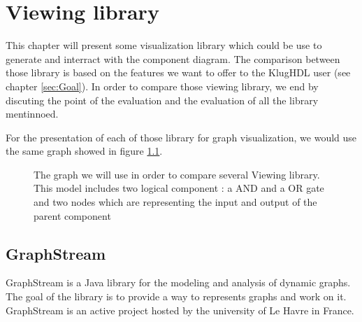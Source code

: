 \chapter{Viewing library} %
\label{cha:Viewing library}

This chapter will present some visualization library which could be use to generate and interract with the component diagram. The comparison between those library is based on the features we want to offer to the KlugHDL user (see chapter \ref{sec:Goal}). In order to compare those viewing library, we end by discuting the point of the evaluation and the evaluation of all the library mentinnoed.

For the presentation of each of those library for graph visualization, we would use the same graph showed in figure \ref{fig:graph-base-model}.

\begin{figure}[h] %
    \centering
    \caption[Graph model for the viewing library comparison]{The graph we will use in order to compare several Viewing library.
    This model includes two logical component : a AND and a OR gate and two nodes
    which are representing the input and output of the parent component}
    \label{fig:graph-base-model}
\end{figure} %

\section{GraphStream} %
\label{sec:GraphStream}

GraphStream is a Java library for the modeling and analysis of dynamic graphs\cite{graphstream}. The goal of the library is to provide a way to represents graphs and work on it\cite{graphstream}. GraphStream is an active project hosted by the university of Le Havre in France.

